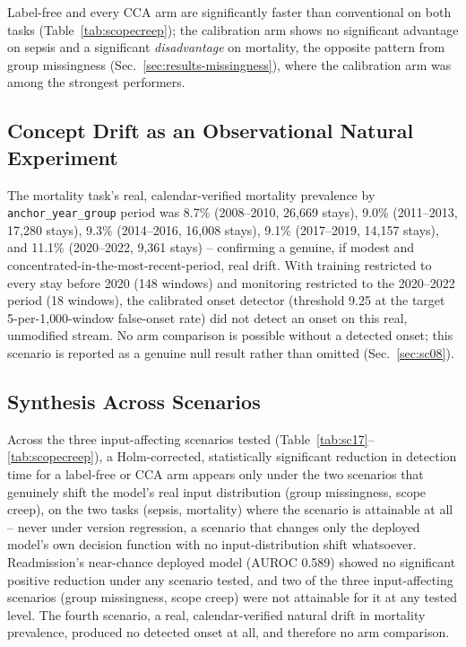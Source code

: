 \documentclass[apajournal,article,submit,oneauthor]{Definitions/mdpi}
\begin{document}
Label-free and every CCA arm are significantly faster than conventional on both tasks (Table~\ref{tab:scopecreep}); the calibration arm shows no significant advantage on sepsis and a significant \emph{disadvantage} on mortality, the opposite pattern from group missingness (Sec.~\ref{sec:results-missingness}), where the calibration arm was among the strongest performers.

\subsection{Concept Drift as an Observational Natural Experiment}

The mortality task's real, calendar-verified mortality prevalence by \texttt{anchor\_year\_group} period was 8.7\% (2008--2010, 26{,}669 stays), 9.0\% (2011--2013, 17{,}280 stays), 9.3\% (2014--2016, 16{,}008 stays), 9.1\% (2017--2019, 14{,}157 stays), and 11.1\% (2020--2022, 9{,}361 stays) -- confirming a genuine, if modest and concentrated-in-the-most-recent-period, real drift. With training restricted to every stay before 2020 (148 windows) and monitoring restricted to the 2020--2022 period (18 windows), the calibrated onset detector (threshold 9.25 at the target 5-per-1{,}000-window false-onset rate) did not detect an onset on this real, unmodified stream. No arm comparison is possible without a detected onset; this scenario is reported as a genuine null result rather than omitted (Sec.~\ref{sec:sc08}).

\subsection{Synthesis Across Scenarios}\label{sec:synthesis}

Across the three input-affecting scenarios tested (Table~\ref{tab:sc17}--\ref{tab:scopecreep}), a Holm-corrected, statistically significant reduction in detection time for a label-free or CCA arm appears only under the two scenarios that genuinely shift the model's real input distribution (group missingness, scope creep), on the two tasks (sepsis, mortality) where the scenario is attainable at all -- never under version regression, a scenario that changes only the deployed model's own decision function with no input-distribution shift whatsoever. Readmission's near-chance deployed model (AUROC 0.589) showed no significant positive reduction under any scenario tested, and two of the three input-affecting scenarios (group missingness, scope creep) were not attainable for it at any tested level. The fourth scenario, a real, calendar-verified natural drift in mortality prevalence, produced no detected onset at all, and therefore no arm comparison.
\end{document}
